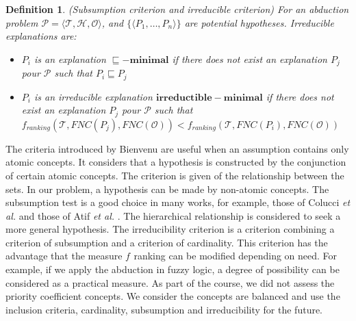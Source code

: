 \documentclass{article}
\newtheorem{mydef}{Definition}
\begin{document}
\begin{mydef}{(Subsumption criterion and irreducible criterion)}
For an abduction problem $\mathcal{P}=\langle \mathcal{T},\mathcal{H}, \mathcal{O}\rangle$, and $\{\langle P_{1},\dots,P_{n}\rangle\}$ are potential hypotheses. 
Irreducible explanations are:
\begin{itemize}
\item  $P_{i}$ is an explanation $\bm{\sqsubseteq -minimal}$ if there does not exist an explanation $P_{j}$ pour $\mathcal{P}$ such that $P_{i}\sqsubseteq P_{j}$
\item  $P_{i}$ is an irreducible explanation $\bm{irreductible-minimal}$ if there does not exist an explanation $P_{j}$ pour $\mathcal{P}$ such that $f_{ranking}(\mathcal{T},FNC(P_{j}),FNC(\mathcal{O})) 
< f_{ranking}(\mathcal{T},FNC(P_{i}),FNC(\mathcal{O}))$
\end{itemize}
\end{mydef}

The criteria introduced by Bienvenu are useful when an assumption contains only atomic concepts. It considers that a hypothesis is constructed by the conjunction of certain atomic concepts.
The criterion is given of the relationship between the sets. In our problem, a hypothesis can be made by non-atomic concepts. The subsumption test is a good choice in many works,
for example, those of Colucci \textit{et al.} \cite{colucci2004uniform} and those of Atif \textit{et al.}  \cite{atif2014explanatory}. 
The hierarchical relationship is considered to seek a more general hypothesis.
The irreducibility criterion is a criterion combining a criterion of subsumption and a criterion of cardinality. This criterion has the advantage that the measure $ f_ {} $ ranking can be modified depending on need.
For example, if we apply the abduction in fuzzy logic, a degree of possibility can be considered as a practical measure. As part of the course, we did not assess the priority coefficient
concepts. We consider the concepts are balanced and use the inclusion criteria, cardinality, subsumption and irreducibility for the future.
\end{document}
